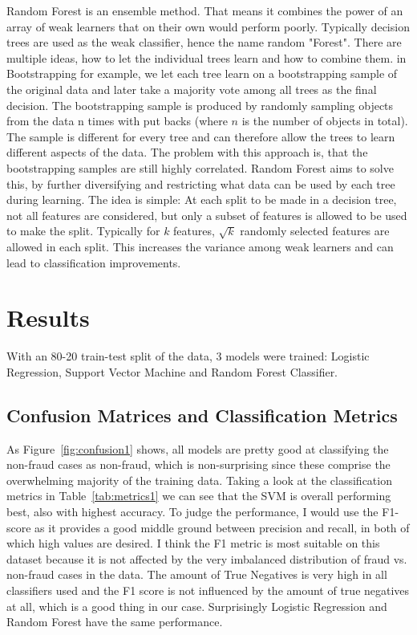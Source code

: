\documentclass[utf8x]{ctexart}
\begin{document}
Random Forest is an ensemble method. That means it combines the power of an array of weak learners that on their own would perform poorly. Typically decision trees are used as the weak classifier, hence the name random "Forest". There are multiple ideas, how to let the individual trees learn and how to combine them. in Bootstrapping for example, we let each tree learn on a bootstrapping sample of the original data and later take a majority vote among all trees as the final decision. The bootstrapping sample is produced by randomly sampling objects from the data n times with put backs (where $n$ is the number of objects in total). The sample is different for every tree and can therefore allow the trees to learn different aspects of the data. The problem with this approach is, that the bootstrapping samples are still highly correlated. Random Forest aims to solve this, by further diversifying and restricting what data can be used by each tree during learning. The idea is simple: At each split to be made in a decision tree, not all features are considered, but only a subset of features is allowed to be used to make the split. Typically for $k$ features, $\sqrt{k}$ randomly selected features are allowed in each split. This increases the variance among weak learners and can lead to classification improvements.

\section{Results}

With an 80-20 train-test split of the data, 3 models were trained: Logistic Regression, Support Vector Machine and Random Forest Classifier.

\subsection{Confusion Matrices and Classification Metrics}
As Figure~\ref{fig:confusion1} shows, all models are pretty good at classifying the non-fraud cases as non-fraud, which is non-surprising since these comprise the overwhelming majority of the training data.
Taking a look at the classification metrics in Table~\ref{tab:metrics1} we can see that the SVM is overall performing best, also with highest accuracy. To judge the performance, I would use the F1-score as it provides a good middle ground between precision and recall, in both of which high values are desired. I think the F1 metric is most suitable on this dataset because it is not affected by the very imbalanced distribution of fraud vs. non-fraud cases in the data. The amount of True Negatives is very high in all classifiers used and the F1 score is not influenced by the amount of true negatives at all, which is a good thing in our case. Surprisingly Logistic Regression and Random Forest have the same performance.
\end{document}
